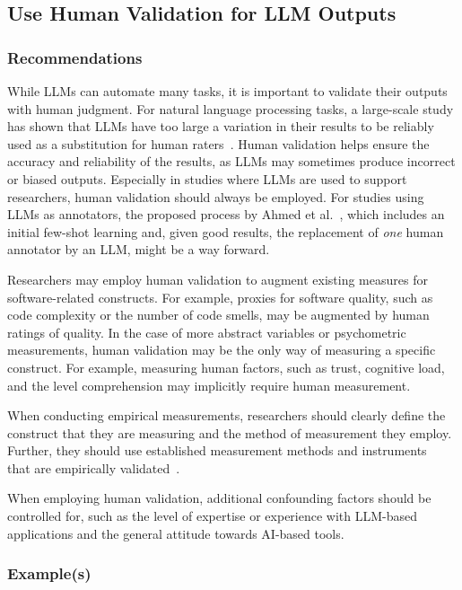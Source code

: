 \documentclass[11pt]{article}
\begin{document}
\subsection{Use Human Validation for LLM Outputs}

\subsubsection{Recommendations}

While LLMs can automate many tasks, it is important to validate their outputs with human judgment.
For natural language processing tasks, a large-scale study has shown that LLMs have too large a variation in their results to be reliably used as a substitution for human raters~\cite{DBLP:journals/corr/abs-2406-18403}. 
Human validation helps ensure the accuracy and reliability of the results, as LLMs may sometimes produce incorrect or biased outputs.
Especially in studies where LLMs are used to support researchers, human validation should always be employed.
For studies using LLMs as annotators, the proposed process by Ahmed et al.~\cite{DBLP:journals/corr/abs-2408-05534}, which includes an initial few-shot learning and, given good results, the replacement of \emph{one} human annotator by an LLM, might be a way forward.

Researchers may employ human validation to augment existing measures for software-related constructs.
For example, proxies for software quality, such as code complexity or the number of code smells, may be augmented by human ratings of quality.
In the case of more abstract variables or psychometric measurements, human validation may be the only way of measuring a specific construct.
For example, measuring human factors, such as trust, cognitive load, and the level comprehension may implicitly require human measurement.

When conducting empirical measurements, researchers should clearly define the construct that they are measuring and the method of measurement they employ.
Further, they should use established measurement methods and instruments~\cite{DBLP:journals/fcomp/HoffmanMKL23} that are empirically validated~\cite{DBLP:conf/chi/PerrigSB23}.

When employing human validation, additional confounding factors should be controlled for, such as the level of expertise or experience with LLM-based applications and the general attitude towards AI-based tools.

\subsubsection{Example(s)}
\end{document}
